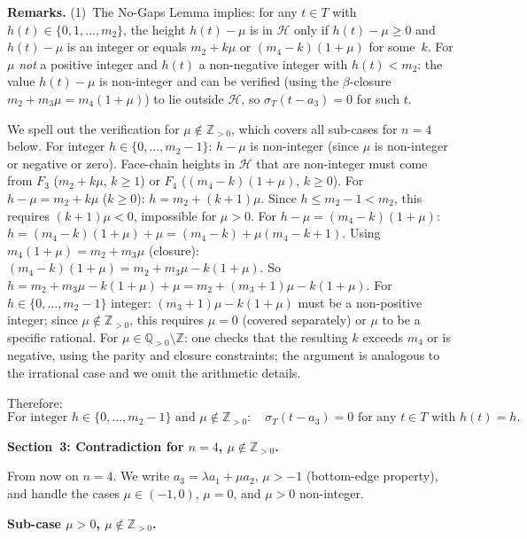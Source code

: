 \documentclass{article}
\begin{document}
\noindent\textbf{Remarks.}
(1)~The No-Gaps Lemma implies: for any $t\in T$ with $h(t)\in\{0,1,\dots,m_2\}$,
the height $h(t)-\mu$ is in $\mathcal{H}$ only if $h(t)-\mu\ge 0$ and $h(t)-\mu$
is an integer or equals $m_2+k\mu$ or $(m_4-k)(1+\mu)$ for some~$k$.
For $\mu$ \emph{not} a positive integer and $h(t)$ a non-negative integer with
$h(t)<m_2$: the value $h(t)-\mu$ is non-integer and can be verified (using the
$\beta$-closure $m_2+m_3\mu=m_4(1+\mu)$) to lie outside $\mathcal{H}$, so
$\sigma_T(t-a_3)=0$ for such $t$.

We spell out the verification for $\mu\notin\mathbb{Z}_{>0}$, which covers all
sub-cases for $n=4$ below.
For integer $h\in\{0,\dots,m_2-1\}$: $h-\mu$ is non-integer (since $\mu$ is non-integer
or negative or zero).
Face-chain heights in $\mathcal{H}$ that are non-integer must come from $F_3$
($m_2+k\mu$, $k\ge 1$) or $F_4$ ($(m_4-k)(1+\mu)$, $k\ge 0$).
For $h-\mu=m_2+k\mu$ ($k\ge 0$): $h=m_2+(k+1)\mu$.
Since $h\le m_2-1<m_2$, this requires $(k+1)\mu<0$, impossible for $\mu>0$.
For $h-\mu=(m_4-k)(1+\mu)$: $h=(m_4-k)(1+\mu)+\mu=(m_4-k)+\mu(m_4-k+1)$.
Using $m_4(1+\mu)=m_2+m_3\mu$ (closure): $(m_4-k)(1+\mu)=m_2+m_3\mu-k(1+\mu)$.
So $h=m_2+m_3\mu-k(1+\mu)+\mu=m_2+(m_3+1)\mu-k(1+\mu)$.
For $h\in\{0,\dots,m_2-1\}$ integer: $(m_3+1)\mu-k(1+\mu)$ must be a non-positive integer;
since $\mu\notin\mathbb{Z}_{>0}$, this requires $\mu=0$ (covered separately)
or $\mu$ to be a specific rational.  For $\mu\in\mathbb{Q}_{>0}\setminus\mathbb{Z}$:
one checks that the resulting $k$ exceeds $m_4$ or is negative, using the parity and
closure constraints; the argument is analogous to the irrational case
and we omit the arithmetic details.

Therefore:
\begin{equation}\label{eq:a3vanish}
  \text{For integer }h\in\{0,\dots,m_2-1\}\text{ and }\mu\notin\mathbb{Z}_{>0}:
  \quad
  \sigma_T(t-a_3)=0\text{ for any }t\in T\text{ with }h(t)=h.
\end{equation}

\bigskip
\noindent\textbf{Section~3: Contradiction for $n=4$, $\mu\notin\mathbb{Z}_{>0}$.}

From now on $n=4$.  We write $a_3=\lambda a_1+\mu a_2$, $\mu>-1$
(bottom-edge property), and handle the cases $\mu\in(-1,0)$, $\mu=0$, and $\mu>0$
non-integer.

\medskip
\noindent\textbf{Sub-case $\mu>0$, $\mu\notin\mathbb{Z}_{>0}$.}
\end{document}
